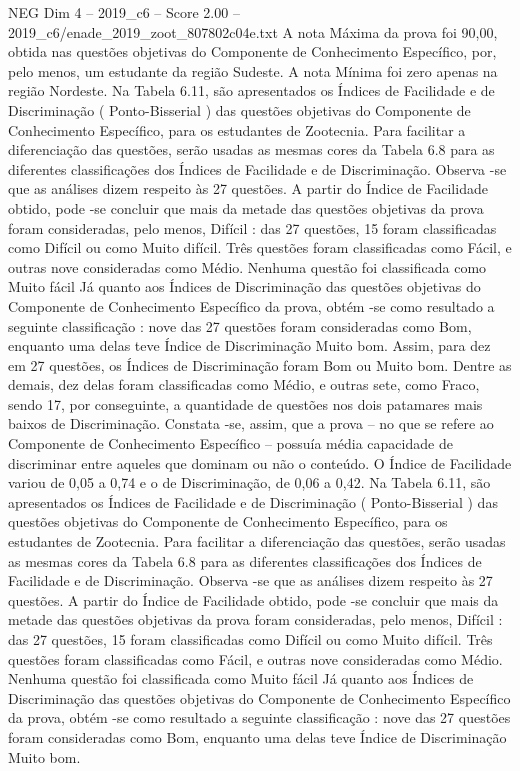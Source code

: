 \begin{textsample}{NEG Dim 4 – 2019\_c6 – Score 2.00 – 2019\_c6/enade\_2019\_zoot\_807802c04e.txt}
A nota Máxima da prova foi 90,00, obtida nas questões objetivas do Componente de Conhecimento Específico, por, pelo menos, um estudante da região Sudeste.
A nota Mínima foi zero apenas na região Nordeste.
Na Tabela 6.11, são apresentados os Índices de Facilidade e de Discriminação ( Ponto-Bisserial ) das questões objetivas do Componente de Conhecimento Específico, para os estudantes de Zootecnia.
Para facilitar a diferenciação das questões, serão usadas as mesmas cores da Tabela 6.8 para as diferentes classificações dos Índices de Facilidade e de Discriminação.
Observa -se que as análises dizem respeito às 27 questões.
A partir do Índice de Facilidade obtido, pode -se concluir que mais da metade das questões objetivas da prova foram consideradas, pelo menos, Difícil : das 27 questões, 15 foram classificadas como Difícil ou como Muito difícil.
Três questões foram classificadas como Fácil, e outras nove consideradas como Médio.
Nenhuma questão foi classificada como Muito fácil Já quanto aos Índices de Discriminação das questões objetivas do Componente de Conhecimento Específico da prova, obtém -se como resultado a seguinte classificação : nove das 27 questões foram consideradas como Bom, enquanto uma delas teve Índice de Discriminação Muito bom.
Assim, para dez em 27 questões, os Índices de Discriminação foram Bom ou Muito bom.
Dentre as demais, dez delas foram classificadas como Médio, e outras sete, como Fraco, sendo 17, por conseguinte, a quantidade de questões nos dois patamares mais baixos de Discriminação.
Constata -se, assim, que a prova – no que se refere ao Componente de Conhecimento Específico – possuía média capacidade de discriminar entre aqueles que dominam ou não o conteúdo.
O Índice de Facilidade variou de 0,05 a 0,74 e o de Discriminação, de 0,06 a 0,42.
Na Tabela 6.11, são apresentados os Índices de Facilidade e de Discriminação ( Ponto-Bisserial ) das questões objetivas do Componente de Conhecimento Específico, para os estudantes de Zootecnia.
Para facilitar a diferenciação das questões, serão usadas as mesmas cores da Tabela 6.8 para as diferentes classificações dos Índices de Facilidade e de Discriminação.
Observa -se que as análises dizem respeito às 27 questões.
A partir do Índice de Facilidade obtido, pode -se concluir que mais da metade das questões objetivas da prova foram consideradas, pelo menos, Difícil : das 27 questões, 15 foram classificadas como Difícil ou como Muito difícil.
Três questões foram classificadas como Fácil, e outras nove consideradas como Médio.
Nenhuma questão foi classificada como Muito fácil Já quanto aos Índices de Discriminação das questões objetivas do Componente de Conhecimento Específico da prova, obtém -se como resultado a seguinte classificação : nove das 27 questões foram consideradas como Bom, enquanto uma delas teve Índice de Discriminação Muito bom.

\end{textsample}
